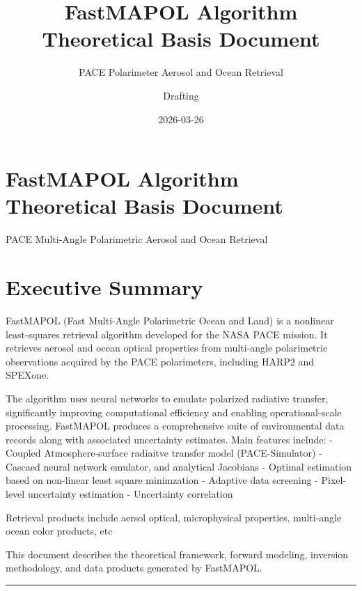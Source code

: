 \documentclass[
  letterpaper,
]{scrbook}
\title{FastMAPOL Algorithm Theoretical Basis Document}
\subtitle{PACE Polarimeter Aerosol and Ocean Retrieval}
\author{Drafting}
\date{2026-03-26}
\renewcommand*\contentsname{Table of contents}
\newcommand\contentsname{Table of contents}
\begin{document}
\frontmatter
\maketitle

\renewcommand*\contentsname{Table of contents}
{
\hypersetup{linkcolor=}
\setcounter{tocdepth}{2}
\tableofcontents
}
\listoffigures
\listoftables

\mainmatter
{}

\chapter{FastMAPOL Algorithm Theoretical Basis
Document}\label{fastmapol-algorithm-theoretical-basis-document}

PACE Multi-Angle Polarimetric Aerosol and Ocean Retrieval

\hfill\break


\chapter{Executive Summary}\label{executive-summary}

FastMAPOL (Fast Multi-Angle Polarimetric Ocean and Land) is a nonlinear
least-squares retrieval algorithm developed for the NASA PACE mission.
It retrieves aerosol and ocean optical properties from multi-angle
polarimetric observations acquired by the PACE polarimeters, including
HARP2 and SPEXone.

The algorithm uses neural networks to emulate polarized radiative
transfer, significantly improving computational efficiency and enabling
operational-scale processing. FastMAPOL produces a comprehensive suite
of environmental data records along with associated uncertainty
estimates. Main features include: - Coupled Atmosphere-surface radiaitve
transfer model (PACE-Simulator) - Cascaed neural network emulator, and
analytical Jacobians - Optimal estimation based on non-linear least
square minimzation - Adaptive data screening - Pixel-level uncertainty
estimation - Uncertainty correlation

Retrieval products include aersol optical, microphysical properties,
multi-angle ocean color products, etc

This document describes the theoretical framework, forward modeling,
inversion methodology, and data products generated by FastMAPOL.

\begin{center}\rule{0.5\linewidth}{0.5pt}\end{center}
\end{document}
